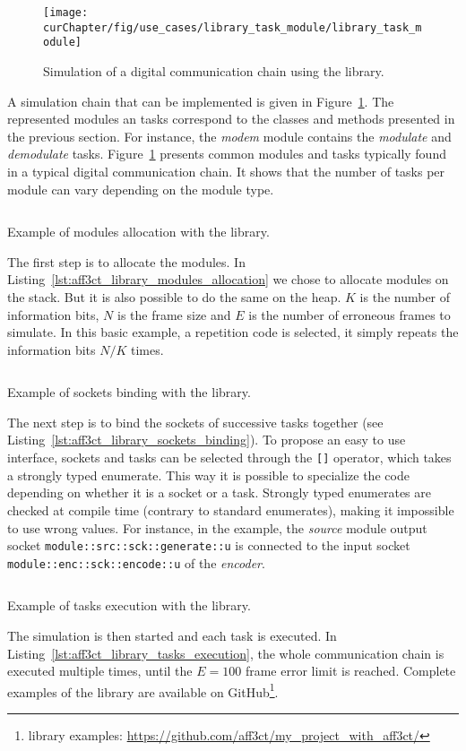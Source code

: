 \begin{figure}[htp]
  \centering
  \texttt{[image: \\curChapter/fig/use\_cases/library\_task\_module/library\_task\_module]}
  \caption{Simulation of a digital communication chain using the \AFFECT
    library.}
  \label{fig:aff3ct_library_task_module}
\end{figure}
A simulation chain that can be implemented is given in
Figure~\ref{fig:aff3ct_library_task_module}. The represented modules an tasks
correspond to the classes and methods presented in the previous section. For
instance, the \textit{modem} module contains the \textit{modulate} and
\textit{demodulate} tasks. Figure~\ref{fig:aff3ct_library_task_module} presents
common modules and tasks typically found in a typical digital communication
chain. It shows that the number of tasks per module can vary depending on the
module type.
\begin{listing}[htp]
  \inputminted[frame=lines,linenos]{C++}{\curChapter/src/use_cases/library/modules_allocation.cpp}
  \caption{Example of modules allocation with the \AFFECT library.}
  \label{lst:aff3ct_library_modules_allocation}
\end{listing}
The first step is to allocate the modules. In
Listing~\ref{lst:aff3ct_library_modules_allocation} we chose to allocate modules
on the stack. But it is also possible to do the same on the heap. $K$ is the
number of information bits, $N$ is the frame size and $E$ is the number of
erroneous frames to simulate. In this basic example, a repetition code is
selected, it simply repeats the information bits $N/K$ times.
\begin{listing}[htp]
  \inputminted[frame=lines,linenos]{C++}{\curChapter/src/use_cases/library/sockets_binding.cpp}
  \caption{Example of sockets binding with the \AFFECT library.}
  \label{lst:aff3ct_library_sockets_binding}
\end{listing}
The next step is to bind the sockets of successive tasks together (see
Listing~\ref{lst:aff3ct_library_sockets_binding}). To propose an easy to use
interface, sockets and tasks can be selected through the \verb|[]| operator,
which takes a \Cxx strongly typed enumerate. This way it is possible to
specialize the code depending on whether it is a socket or a task. Strongly
typed enumerates are checked at compile time (contrary to standard enumerates),
making it impossible to use wrong values. For instance, in the example, the
\textit{source} module output socket \verb|module::src::sck::generate::u| is
connected to the input socket \verb|module::enc::sck::encode::u| of the
\textit{encoder}.
\begin{listing}[htp]
  \inputminted[frame=lines,linenos]{C++}{\curChapter/src/use_cases/library/tasks_execution.cpp}
  \caption{Example of tasks execution with the \AFFECT library.}
  \label{lst:aff3ct_library_tasks_execution}
\end{listing}
The simulation is then started and each task is executed. In
Listing~\ref{lst:aff3ct_library_tasks_execution}, the whole communication chain
is executed multiple times, until the $E = 100$ frame error limit is reached.
Complete examples of the \AFFECT library are available on
GitHub\footnote{\AFFECT library examples: \url{https://github.com/aff3ct/my_project_with_aff3ct/}}.

